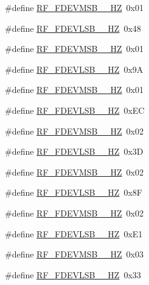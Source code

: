 \begin{DoxyCompactItemize}
\item 
\#define \mbox{\hyperlink{sx1276_regs-_fsk_8h_ada7253b158b4a51d4a8621eff8d3aa59}{R\+F\+\_\+\+F\+D\+E\+V\+M\+S\+B\+\_\+\_\+\+HZ}}~0x01
\item 
\#define \mbox{\hyperlink{sx1276_regs-_fsk_8h_a6e922112d9f9ada8500acab833bec19d}{R\+F\+\_\+\+F\+D\+E\+V\+L\+S\+B\+\_\+\_\+\+HZ}}~0x48
\item 
\#define \mbox{\hyperlink{sx1276_regs-_fsk_8h_a93a967f33b1732e004831862b3d4964f}{R\+F\+\_\+\+F\+D\+E\+V\+M\+S\+B\+\_\+\_\+\+HZ}}~0x01
\item 
\#define \mbox{\hyperlink{sx1276_regs-_fsk_8h_a391d42e4ff6fa112df9198fb1a1803fe}{R\+F\+\_\+\+F\+D\+E\+V\+L\+S\+B\+\_\+\_\+\+HZ}}~0x9A
\item 
\#define \mbox{\hyperlink{sx1276_regs-_fsk_8h_a6b95e0d91882f1c75092a944ccdf8952}{R\+F\+\_\+\+F\+D\+E\+V\+M\+S\+B\+\_\+\_\+\+HZ}}~0x01
\item 
\#define \mbox{\hyperlink{sx1276_regs-_fsk_8h_a30c6d67de342780865db12984208b286}{R\+F\+\_\+\+F\+D\+E\+V\+L\+S\+B\+\_\+\_\+\+HZ}}~0x\+EC
\item 
\#define \mbox{\hyperlink{sx1276_regs-_fsk_8h_aae123662302055b52008db80777f3bad}{R\+F\+\_\+\+F\+D\+E\+V\+M\+S\+B\+\_\+\_\+\+HZ}}~0x02
\item 
\#define \mbox{\hyperlink{sx1276_regs-_fsk_8h_ae12db3f305913ae3a16466507fdd3d3c}{R\+F\+\_\+\+F\+D\+E\+V\+L\+S\+B\+\_\+\_\+\+HZ}}~0x3D
\item 
\#define \mbox{\hyperlink{sx1276_regs-_fsk_8h_aa12a12d2a93e1a5c35134219f35bb51c}{R\+F\+\_\+\+F\+D\+E\+V\+M\+S\+B\+\_\+\_\+\+HZ}}~0x02
\item 
\#define \mbox{\hyperlink{sx1276_regs-_fsk_8h_a635b9754fb64e7fa3d62a0eb3a00e086}{R\+F\+\_\+\+F\+D\+E\+V\+L\+S\+B\+\_\+\_\+\+HZ}}~0x8F
\item 
\#define \mbox{\hyperlink{sx1276_regs-_fsk_8h_a5e36011fe2f0d8bee1bd3aa9a928c18c}{R\+F\+\_\+\+F\+D\+E\+V\+M\+S\+B\+\_\+\_\+\+HZ}}~0x02
\item 
\#define \mbox{\hyperlink{sx1276_regs-_fsk_8h_a8e69ee5a2729700dda58111180fae357}{R\+F\+\_\+\+F\+D\+E\+V\+L\+S\+B\+\_\+\_\+\+HZ}}~0x\+E1
\item 
\#define \mbox{\hyperlink{sx1276_regs-_fsk_8h_a2d77a912cc45a97d9fffaeafa791b186}{R\+F\+\_\+\+F\+D\+E\+V\+M\+S\+B\+\_\+\_\+\+HZ}}~0x03
\item 
\#define \mbox{\hyperlink{sx1276_regs-_fsk_8h_a1675346ade9c8f671aac79a317512699}{R\+F\+\_\+\+F\+D\+E\+V\+L\+S\+B\+\_\+\_\+\+HZ}}~0x33

\end{DoxyCompactItemize}
